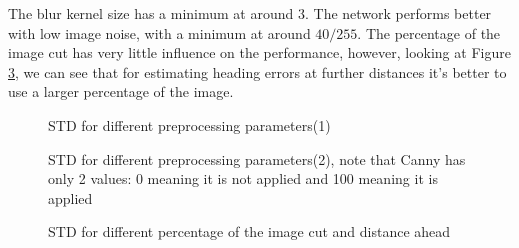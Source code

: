 \documentclass[a4paper,12pt,sort&compress]{article}
\begin{document}
    The blur kernel size has a minimum at around $\num{3}$. The network performs better with low
    image noise, with a minimum at around $40 / 255$. The percentage of the image cut has very
    little influence on the performance, however, looking at Figure
    \ref{fig:3d_keep_bottom_he_dist}, we can see that for estimating heading errors at further
    distances it's better to use a larger percentage of the image.

    \begin{figure}
        \centering
        \begin{subfigure}[b]{\textwidth}
            \centering
        \end{subfigure}
        \begin{subfigure}[b]{\textwidth}
            \centering
        \end{subfigure}
        \caption{STD for different preprocessing parameters(1)}
        \label{fig:preprocessing_params1}
    \end{figure}

    \begin{figure}
        \centering
        \begin{subfigure}[b]{\textwidth}
            \centering
        \end{subfigure}
        \begin{subfigure}[b]{\textwidth}
            \centering
        \end{subfigure}
        \caption{STD for different preprocessing parameters(2), note that Canny has only 2 values: 0 meaning it is not applied and 100 meaning it is applied}
        \label{fig:preprocessing_params2}
    \end{figure}


    \begin{figure}
        \centering
        \caption{STD for different percentage of the image cut and distance ahead}
        \label{fig:3d_keep_bottom_he_dist}
    \end{figure}
\end{document}
